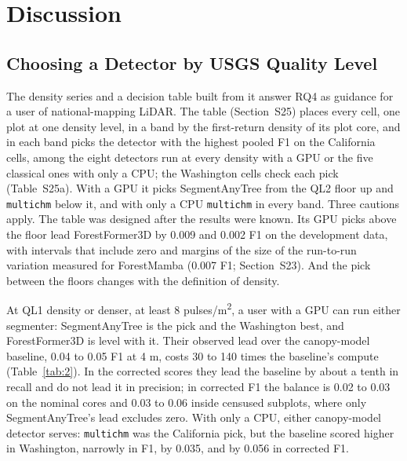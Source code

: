 \documentclass[journal]{IEEEtran}
\begin{document}
\section{Discussion}\label{sec:6}

\subsection{Choosing a Detector by USGS Quality Level}\label{sec:6.1}

The density series and a decision table built from it answer RQ4 as guidance
for a user of national-mapping LiDAR. The table (Section~S25) places every cell,
one plot at one density level, in a band by the first-return density of its plot
core, and in each band picks the detector with the highest pooled F1 on the
California cells, among the eight detectors run at every density with a GPU or
the five classical ones with only a CPU; the Washington cells check each pick
(Table~S25a). With a GPU it picks SegmentAnyTree from the QL2 floor up and
\texttt{multichm} below it, and with only a CPU \texttt{multichm} in every band. Three
cautions apply. The table was designed after the results were known. Its GPU
picks above the floor lead ForestFormer3D by 0.009 and 0.002 F1 on the
development data, with intervals that include zero and margins of the size of
the run-to-run variation measured for ForestMamba (0.007 F1; Section~S23). And
the pick between the floors changes with the definition of density.

At QL1 density or denser, at least 8 pulses/m\textsuperscript{2}, a user with a GPU can run either
segmenter: SegmentAnyTree is the pick and the Washington best, and
ForestFormer3D is level with it. Their observed lead over the canopy-model
baseline, 0.04 to 0.05 F1 at 4 m, costs 30 to 140 times the baseline's compute
(Table~\ref{tab:2}). In the corrected scores they lead the baseline by about a tenth in
recall and do not lead it in precision; in corrected F1 the balance is 0.02 to
0.03 on the nominal cores and 0.03 to 0.06 inside censused subplots, where only
SegmentAnyTree's lead excludes zero. With only a CPU, either canopy-model
detector serves: \texttt{multichm} was the California pick, but the baseline scored
higher in Washington, narrowly in F1, by 0.035, and by 0.056 in corrected F1.
\end{document}
